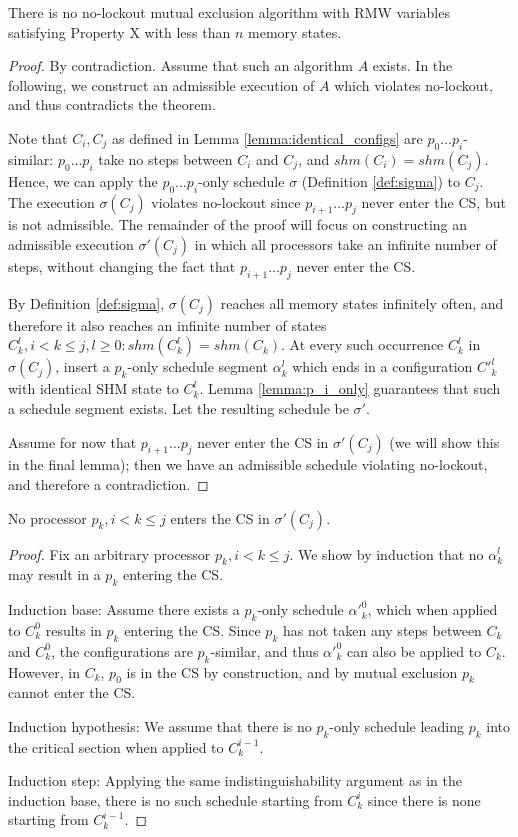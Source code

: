 \begin{theorem}
There is no no-lockout mutual exclusion algorithm with RMW variables satisfying
Property X with less than $n$ memory states.
\end{theorem}

\begin{proof}
By contradiction. Assume that such an algorithm $A$ exists.
In the following, we construct an admissible execution of $A$ which violates
no-lockout, and thus contradicts the theorem.

Note that $C_i, C_j$ as defined in Lemma \ref{lemma:identical_configs}
are $p_0 \ldots p_i$-similar: $p_0 \ldots p_i$ take no steps between
$C_i$ and $C_j$, and $shm(C_i) = shm(C_j)$. Hence, we can apply the 
$p_0 \ldots p_i$-only schedule $\sigma$ (Definition \ref{def:sigma})
to $C_j$. The execution $\sigma(C_j)$ violates no-lockout since $p_{i+1} \ldots p_j$
never enter the CS, but is not admissible. The remainder of the proof will
focus on constructing an admissible execution $\sigma'(C_j)$ in which
all processors take an infinite number of steps, without changing the fact that
$p_{i+1} \ldots p_j$ never enter the CS.

By Definition \ref{def:sigma}, $\sigma(C_j)$ reaches all memory states infinitely
often, and therefore it also reaches an infinite number of states
$C^l_k, i < k \leq j, l \geq 0: shm(C^l_k) = shm(C_k)$. At every such occurrence
$C^l_k$ in $\sigma(C_j)$, insert a $p_k$-only schedule segment $\alpha^l_k$ which ends in
a configuration $C'^l_k$ with identical SHM state to $C^l_k$. Lemma \ref{lemma:p_i_only}
guarantees that such a schedule segment exists. Let the resulting schedule
be $\sigma'$.

Assume for now that $p_{i+1} \ldots p_j$ never enter the
CS in $\sigma'(C_j)$ (we will show this in the final lemma); then we have an
admissible schedule violating no-lockout, and therefore a contradiction.
\end{proof}

\begin{lemma}
No processor $p_k, i < k \leq j$ enters the CS in $\sigma'(C_j)$.
\end{lemma}

\begin{proof}
Fix an arbitrary processor $p_k, i < k \leq j$.
We show by induction that no $\alpha^l_k$ may result in a $p_k$ entering the CS.

Induction base: Assume there exists a $p_k$-only schedule $\alpha'^0_k$, which
when applied to $C^0_k$ results in $p_k$ entering the CS. Since $p_k$
has not taken any steps between $C_k$ and $C^0_k$, the configurations are $p_k$-similar,
and thus $\alpha'^0_k$ can also be applied to $C_k$. However, in $C_k$, 
$p_0$ is in the CS by construction, and by mutual exclusion $p_k$ cannot enter 
the CS.

Induction hypothesis: We assume that there is no $p_k$-only schedule leading
$p_k$ into the critical section when applied to $C^{i-1}_k$.

Induction step: Applying the same indistinguishability argument as in the induction
base, there is no such schedule starting from $C^i_k$ since there is none 
starting from $C^{i-1}_k$.
\end{proof}

